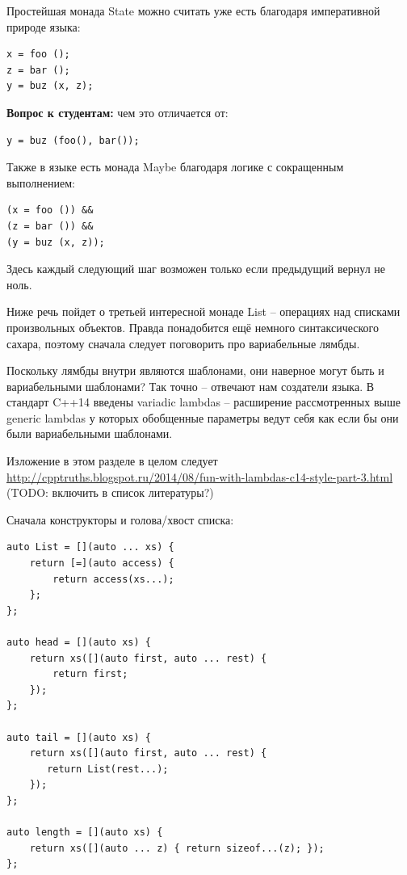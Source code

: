 \documentclass[a4paper,12pt,oneside]{article}
\newif\ifanswers
\begin{document}
Простейшая монада State можно считать уже есть благодаря императивной природе языка:

\begin{lstlisting}
x = foo ();
z = bar ();
y = buz (x, z);
\end{lstlisting}

\textbf{Вопрос к студентам:} чем это отличается от:

\begin{lstlisting}
y = buz (foo(), bar());
\end{lstlisting}

\ifanswers
Правильный ответ: задана последовательность выполнения функций \lstinline!foo! и \lstinline!bar! 
\fi

Также в языке есть монада Maybe благодаря логике с сокращенным выполнением:

\begin{lstlisting}
(x = foo ()) &&
(z = bar ()) &&
(y = buz (x, z));
\end{lstlisting}

Здесь каждый следующий шаг возможен только если предыдущий вернул не ноль.

Ниже речь пойдет о третьей интересной монаде List -- операциях над списками произвольных объектов. Правда понадобится ещё немного синтаксического сахара, поэтому сначала следует поговорить про вариабельные лямбды.

Поскольку лямбды внутри являются шаблонами, они наверное могут быть и вариабельными шаблонами? Так точно -- отвечают нам создатели языка. В стандарт C++14 введены variadic lambdas -- расширение рассмотренных выше generic lambdas у которых обобщенные параметры ведут себя как если бы они были вариабельными шаблонами.

Изложение в этом разделе в целом следует \url{http://cpptruths.blogspot.ru/2014/08/fun-with-lambdas-c14-style-part-3.html} (TODO: включить в список литературы?)

Сначала конструкторы и голова/хвост списка:

\begin{lstlisting}
auto List = [](auto ... xs) {
    return [=](auto access) { 
        return access(xs...); 
    };
};

auto head = [](auto xs) {
    return xs([](auto first, auto ... rest) { 
        return first; 
    });
};

auto tail = [](auto xs) {
    return xs([](auto first, auto ... rest) { 
       return List(rest...); 
    });
};

auto length = [](auto xs) {
    return xs([](auto ... z) { return sizeof...(z); });
};
\end{lstlisting}
\end{document}
